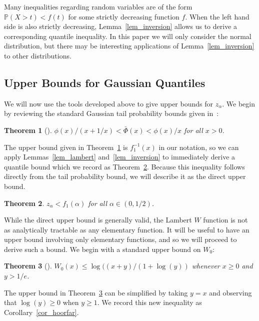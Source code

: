 \documentclass[12pt]{article}
\newcommand{\prob}[1]{\mathbb{P}(#1)}
\newtheorem{theorem}{Theorem}
\numberwithin{theorem}{section}
\begin{document}
Many inequalities regarding random variables are of the form $\prob{X > t} < f(t)$ for some strictly decreasing function $f$.  When the left hand side is also strictly decreasing, Lemma~\ref{lem_inversion} allows us to derive a corresponding quantile inequality.  In this paper we will only consider the normal distribution, but there may be interesting applications of Lemma~\ref{lem_inversion} to other distributions.

\subsection{Upper Bounds for Gaussian Quantiles}
\label{sec_ineq_upper}

We will now use the tools developed above to give upper bounds for $z_\alpha$.  We begin by reviewing the standard Gaussian tail probability bounds given in~\cite{gordon1941millsRatio}:

\begin{theorem}[\cite{gordon1941millsRatio}]
\label{thm_tail_bounds}
$\phi(x) / (x + 1 / x) < \bar{\Phi}(x) < \phi(x) / x$ for all $x > 0$.
\end{theorem}

The upper bound given in Theorem~\ref{thm_tail_bounds} is $f_1^{-1}(x)$ in our notation, so we can apply Lemmas~\ref{lem_lambert} and~\ref{lem_inversion} to immediately derive a quantile bound which we record as Theorem~\ref{thm_upper_bound_direct}.  Because this inequality follows directly from the tail probability bound, we will describe it as the direct upper bound.

\begin{theorem}
\label{thm_upper_bound_direct}
$z_\alpha < f_1(\alpha)$ for all $\alpha \in (0, 1/2)$.
\end{theorem}

While the direct upper bound is generally valid, the Lambert $W$ function is not as analytically tractable as any elementary function.  It will be useful to have an upper bound involving only elementary functions, and so we will proceed to derive such a bound.  We begin with a standard upper bound on $W_0$:

\begin{theorem}[\cite{hoorfar2008inequalities}]
\label{thm_hoorfar}
$W_0(x) \leq \log((x + y) / (1 + \log(y))$ whenever $x \geq 0$ and $y > 1 / e$.
\end{theorem}

\noindent
The upper bound in Theorem~\ref{thm_hoorfar} can be simplified by taking $y = x$ and observing that $\log(y) \geq 0$ when $y \geq 1$.  We record this new inequality as Corollary~\ref{cor_hoorfar}.
\end{document}
